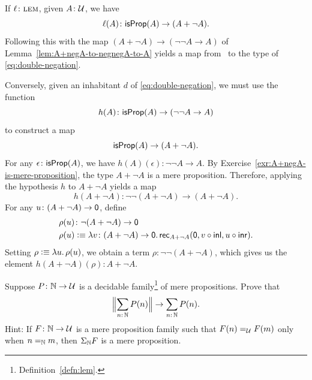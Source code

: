 \begin{solution}
    If $\ell\colon\Lem$, given $A\colon\univ$, we have
    \[
        \ell(A)\colon\fun{isProp}(A)\to(A+\neg A).
    \]
    Following this with the map $(A+\neg A)\to(\neg\neg A\to A)$ of Lemma~\ref{lem:A+negA-to-negnegA-to-A} yields a map from \Lem\ to the type of \eqref{eq:double-negation}.

    Conversely, given an inhabitant $d$ of \eqref{eq:double-negation}, we must use the function
    \[
        h(A)\colon\fun{isProp}(A)\to(\neg\neg A\to A)
    \]
    to construct a map
    \[
        \mathsf{isProp}(A)\to(A+\neg A).
    \]
    For any $\epsilon\colon\fun{isProp}(A)$, we have $h(A)(\epsilon)\colon\neg\neg A\to A$. By Exercise~\ref{exr:A+negA-is-mere-proposition}, the type $A+\neg A$ is a mere proposition. Therefore, applying the hypothesis $h$ to $A+\neg A$ yields a map
    \[
        h(A+\neg A)\colon\neg\neg(A+\neg A)\to(A+\neg A).
    \]
    For any $u\colon(A+\neg A)\to\fun0$, define
    \begin{align*}
        \rho(u)&\colon\neg(A+\neg A)\to\fun0\\
        \rho(u)&\defeq\lambda v\colon(A+\neg A)\to\fun0.\,\fun{rec}_{A+\neg A}(\fun0,v\circ\fun{inl},u\circ\fun{inr}).
    \end{align*}
    Setting $\rho\mathrel{\vcentcolon}\equiv\lambda u.\,\rho(u)$, we obtain a term $\rho\colon\neg\neg(A+\neg A)$, which gives us the element $h(A+\neg A)(\rho)\colon A+\neg A$.
    
\end{solution}

\begin{exr}\fe\label{exr:decidable+mere-proposition-family}
    Suppose\/ $P\colon\N\to\univ$ is a decidable family\footnote{Definition~\ref{defn:lem}.} of mere propositions. Prove that
    \[
        \Bigl\lVert\sum_{n\colon\N}P(n)\Bigr\rVert\to\sum_{n\colon\N}P(n).
    \]
    {\upshape Hint: If $F\colon\N\to\univ$ is a mere proposition family such that $F(n)\mathrel{=_{\mathcal U}} F(m)$ only when $n\mathrel{=_{\mathbb{N}}} m$, then $\Sigma_{\mathbb{N}} F$ is a mere proposition.}
\end{exr}

